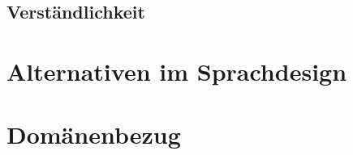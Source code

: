 
\subsection{Verständlichkeit} %
\label{sub:verstandlichkeit}



\section{Alternativen im Sprachdesign} %
\label{sec:alternativen_im_sprachdesign}


\section{Domänenbezug} %
\label{sec:domanenbezug}

